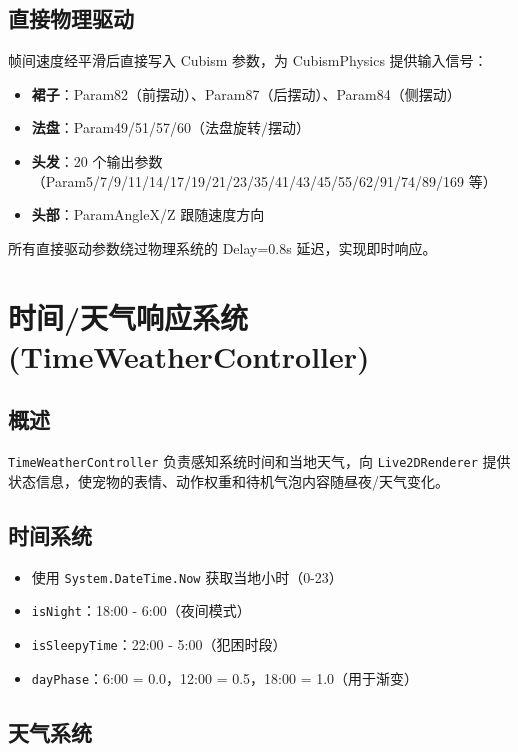\documentclass[12pt,a4paper]{ctexart}
\begin{document}
\subsection{直接物理驱动}

帧间速度经平滑后直接写入 Cubism 参数，为 CubismPhysics 提供输入信号：

\begin{itemize}
    \item \textbf{裙子}：Param82（前摆动）、Param87（后摆动）、Param84（侧摆动）
    \item \textbf{法盘}：Param49/51/57/60（法盘旋转/摆动）
    \item \textbf{头发}：20 个输出参数（Param5/7/9/11/14/17/19/21/23/35/41/43/45/55/62/91/74/89/169 等）
    \item \textbf{头部}：ParamAngleX/Z 跟随速度方向
\end{itemize}

所有直接驱动参数绕过物理系统的 Delay=0.8s 延迟，实现即时响应。

\section{时间/天气响应系统 (TimeWeatherController)}

\subsection{概述}

\texttt{TimeWeatherController} 负责感知系统时间和当地天气，向 \texttt{Live2DRenderer} 提供状态信息，使宠物的表情、动作权重和待机气泡内容随昼夜/天气变化。

\subsection{时间系统}

\begin{itemize}
    \item 使用 \texttt{System.DateTime.Now} 获取当地小时（0-23）
    \item \texttt{isNight}：18:00 - 6:00（夜间模式）
    \item \texttt{isSleepyTime}：22:00 - 5:00（犯困时段）
    \item \texttt{dayPhase}：6:00 = 0.0，12:00 = 0.5，18:00 = 1.0（用于渐变）
\end{itemize}

\subsection{天气系统}
\end{document}
